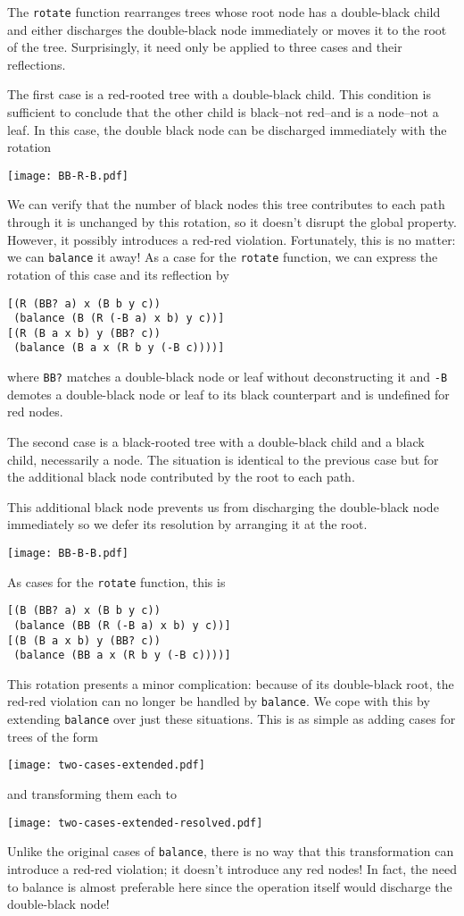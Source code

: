 \documentclass[preprint]{sigplanconf}
\begin{document}
The \texttt{rotate} function rearranges trees whose root node has a double-black child and either discharges the double-black node immediately or moves it to the root of the tree. Surprisingly, it need only be applied to three cases and their reflections.

The first case is a red-rooted tree with a double-black child. This condition is sufficient to conclude that the other child is black--not red--and is a node--not a leaf. In this case, the double black node can be discharged immediately with the rotation
\begin{center}
\texttt{[image: BB-R-B.pdf]}
\end{center}
We can verify that the number of black nodes this tree contributes to each path through it is unchanged by this rotation, so it doesn't disrupt the global property. However, it possibly introduces a red-red violation. Fortunately, this is no matter: we can \texttt{balance} it away! As a case for the \texttt{rotate} function, we can express the rotation of this case and its reflection by
\begin{verbatim}
[(R (BB? a) x (B b y c))
 (balance (B (R (-B a) x b) y c))]
[(R (B a x b) y (BB? c))
 (balance (B a x (R b y (-B c))))]
\end{verbatim}
where \texttt{BB?} matches a double-black node or leaf without deconstructing it and \texttt{-B} demotes a double-black node or leaf to its black counterpart and is undefined for red nodes.

The second case is a black-rooted tree with a double-black child and a black child, necessarily a node. The situation is identical to the previous case but for the additional black node contributed by the root to each path.

This additional black node prevents us from discharging the double-black node immediately so we defer its resolution by arranging it at the root.
\begin{center}
\texttt{[image: BB-B-B.pdf]}
\end{center}
As cases for the \texttt{rotate} function, this is
\begin{verbatim}
[(B (BB? a) x (B b y c))
 (balance (BB (R (-B a) x b) y c))]
[(B (B a x b) y (BB? c))
 (balance (BB a x (R b y (-B c))))]
\end{verbatim}
This rotation presents a minor complication: because of its double-black root, the red-red violation can no longer be handled by \texttt{balance}. We cope with this by extending \texttt{balance} over just these situations. This is as simple as adding cases for trees of the form
\begin{center}
\texttt{[image: two-cases-extended.pdf]}
\end{center}
and transforming them each to
\begin{center}
\texttt{[image: two-cases-extended-resolved.pdf]}
\end{center}
Unlike the original cases of \texttt{balance}, there is no way that this transformation can introduce a red-red violation; it doesn't introduce any red nodes! In fact, the need to balance is almost preferable here since the operation itself would discharge the double-black node!
\end{document}
